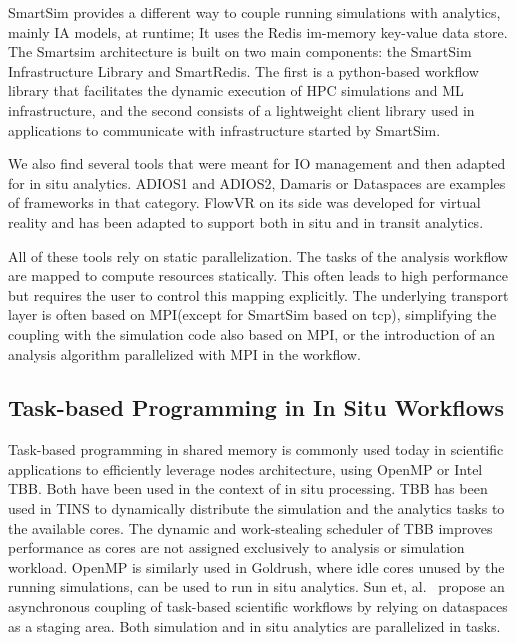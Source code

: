 SmartSim\cite{smartsim_2022, site_introduction_smartsim} provides a different way to couple running simulations with analytics, mainly IA models, at runtime; It uses the Redis\cite{redis} im-memory key-value data store. The Smartsim architecture is built on two main components: the SmartSim Infrastructure Library and SmartRedis. The first is a python-based workflow library that facilitates the dynamic execution of HPC simulations and ML infrastructure, and the second consists of a lightweight client library used in applications to communicate with infrastructure started by SmartSim\cite{smartsim_2022}. 

We also find several tools that were meant for IO management and then adapted for in situ analytics. ADIOS1\cite{lofstead_insights_2013_adios,boyuka_transparent_2014_adios} and ADIOS2\cite{godoy_adios2_2020}, Damaris\cite{dorier_damaris_2012} or 
Dataspaces\cite{docan_dataspaces_2012} are examples of frameworks in that category. FlowVR\cite{dreher_flexible_2014} on its side was developed for virtual reality and has been adapted to support both in situ and in transit analytics.
 
All of these tools rely on static parallelization. The tasks of the analysis workflow are mapped to compute resources statically.
This often leads to high performance but requires the user to control this mapping explicitly. The underlying transport layer is often based on MPI(except for SmartSim based on tcp\cite{site_introduction_smartsim}), simplifying the coupling with the simulation code also based on MPI, or the introduction of an analysis algorithm parallelized with MPI in the workflow. 



\subsection{Task-based Programming in In Situ Workflows}

Task-based programming in shared memory is commonly used today in scientific applications to efficiently leverage nodes architecture, using OpenMP\cite{openMP} or Intel TBB\cite{Robison2011tbb}. Both have been used in the context of in situ processing. TBB has been used in TINS\cite{yokota_tins_2018} to dynamically distribute the simulation and the analytics tasks to the available cores. The dynamic and work-stealing scheduler of TBB improves performance as cores are not assigned exclusively to analysis or simulation workload. OpenMP is similarly used in Goldrush\cite{zheng2013goldrush}, where idle cores unused by the running simulations, can be used to run in situ analytics.   
Sun et, al.~\cite{staging_2016_manish} propose an asynchronous coupling of task-based scientific workflows by relying on  dataspaces\cite{docan_dataspaces_2012} as a staging area. Both simulation and in situ analytics are parallelized in tasks. 



